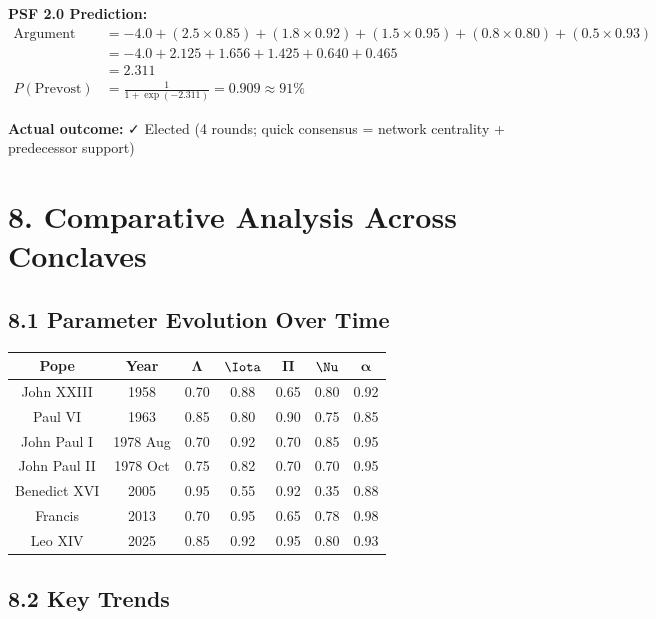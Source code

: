 \documentclass[11pt]{article}
\begin{document}
\textbf{PSF 2.0 Prediction:}
\begin{align*}
\text{Argument} &= -4.0 + (2.5 \times 0.85) + (1.8 \times 0.92) + (1.5 \times 0.95) + (0.8 \times 0.80) + (0.5 \times 0.93) \\
&= -4.0 + 2.125 + 1.656 + 1.425 + 0.640 + 0.465 \\
&= 2.311 \\
P(\text{Prevost}) &= \frac{1}{1 + \exp(-2.311)} = 0.909 \approx 91\%
\end{align*}

\textbf{Actual outcome:} ✓ Elected (4 rounds; quick consensus = network centrality + predecessor support)

\section{8. Comparative Analysis Across Conclaves}

\subsection{8.1 Parameter Evolution Over Time}

\begin{longtable}{|c|c|c|c|c|c|c|}
\hline
\textbf{Pope} & \textbf{Year} & $\boldsymbol{\Lambda}$ & $\boldsymbol{\Iota}$ & $\boldsymbol{\Pi}$ & $\boldsymbol{\Nu}$ & $\boldsymbol{\alpha}$ \\
\hline
\endhead

John XXIII & 1958 & 0.70 & 0.88 & 0.65 & 0.80 & 0.92 \\
Paul VI & 1963 & 0.85 & 0.80 & 0.90 & 0.75 & 0.85 \\
John Paul I & 1978 Aug & 0.70 & 0.92 & 0.70 & 0.85 & 0.95 \\
John Paul II & 1978 Oct & 0.75 & 0.82 & 0.70 & 0.70 & 0.95 \\
Benedict XVI & 2005 & 0.95 & 0.55 & 0.92 & 0.35 & 0.88 \\
Francis & 2013 & 0.70 & 0.95 & 0.65 & 0.78 & 0.98 \\
Leo XIV & 2025 & 0.85 & 0.92 & 0.95 & 0.80 & 0.93 \\
\hline
\end{longtable}

\subsection{8.2 Key Trends}
\end{document}
